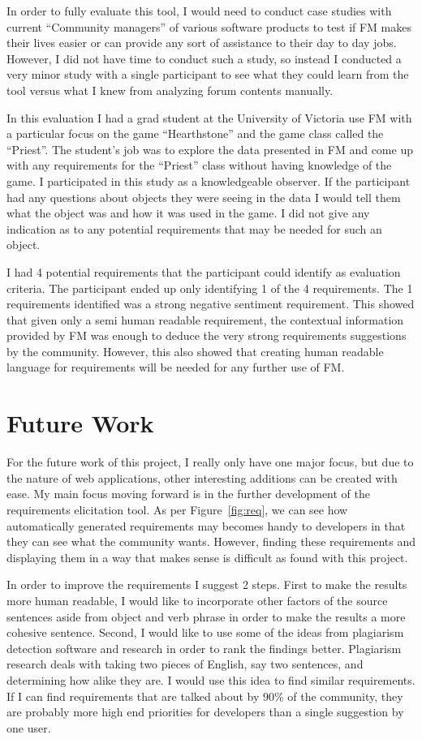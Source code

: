 \documentclass[conference]{IEEEtran}
\begin{document}
In order to fully evaluate this tool, I would need to conduct case studies with current ``Community managers'' of
various software products to test if FM makes their lives easier or can provide any sort of assistance to their
day to day jobs. However, I did not have time to conduct such a study, so instead I conducted a very minor study
with a single participant to see what they could learn from the tool versus what I knew from analyzing forum
contents manually.

In this evaluation I had a grad student at the University of Victoria use FM with a particular focus on the
game ``Hearthstone'' and the game class called the ``Priest''. The student's job was to explore the data presented
in FM and come up with any requirements for the ``Priest'' class without having knowledge of the game. I participated
in this study as a knowledgeable observer. If the participant had any questions about objects they were seeing in the
data I would tell them what the object was and how it was used in the game. I did not give any indication as to
any potential requirements that may be needed for such an object.

I had 4 potential requirements that the participant could identify as evaluation criteria. The participant ended
up only identifying 1 of the 4 requirements. The 1 requirements identified was a strong negative sentiment requirement.
This showed that given only a semi human readable requirement, the contextual information provided by FM was enough to
deduce the very strong requirements suggestions by the community. However, this also showed that creating human
readable language for requirements will be needed for any further use of FM.

\section{Future Work}
\label{sec:fw}

For the future work of this project, I really only have one major focus, but due to the nature of web applications,
other interesting additions can be created with ease. My main focus moving forward is in the further development
of the requirements elicitation tool. As per Figure~\ref{fig:req}, we can see how automatically generated
requirements may becomes handy to developers in that they can see what the community wants. However, finding 
these requirements and displaying them in a way that makes sense is difficult as found with this project.

In order to improve the requirements I suggest 2 steps. First to make the results more human readable, I would
like to incorporate other factors of the source sentences aside from object and verb phrase in order to make
the results a more cohesive sentence. Second, I would like to use some of the ideas from plagiarism detection
software and research in order to rank the findings better. Plagiarism research deals with taking two pieces of
English, say two sentences, and determining how alike they are. I would use this idea to find similar requirements.
If I can find requirements that are talked about by 90\% of the community, they are probably more high end priorities
for developers than a single suggestion by one user.
\end{document}
